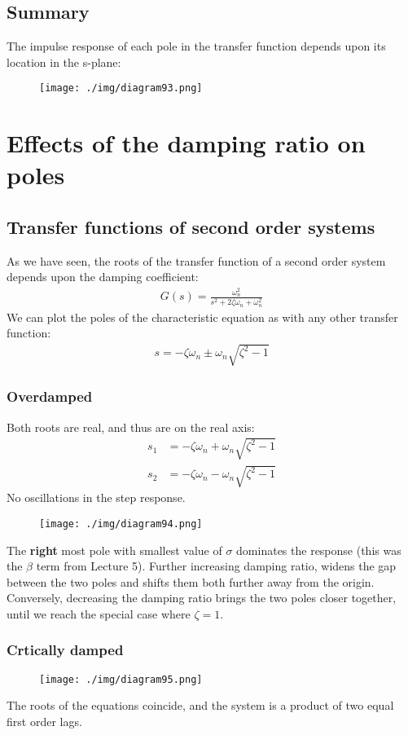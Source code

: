 \subsection{Summary}
The impulse response of each pole in the transfer function depends upon its location in the s-plane:
\begin{figure}[H]
  \centering
  \texttt{[image: ./img/diagram93.png]}
  \caption{}
\end{figure}
\section{Effects of the damping ratio on poles}
\subsection{Transfer functions of second order systems}
As we have seen, the roots of the transfer function of a second order system depends upon the damping coefficient:
\begin{align}
  G(s) = \frac{\omega_n^2}{s^2 + 2 \zeta \omega_n + \omega_n^2}
\end{align}
We can plot the poles of the characteristic equation as with any other transfer function:
\begin{align}
  s = -\zeta \omega_n \pm \omega_n \sqrt{\zeta^2 - 1}
\end{align}
\subsubsection{Overdamped}
Both roots are real, and thus are on the real axis:
\begin{align}
  s_1 & = -\zeta \omega_n + \omega_n \sqrt{\zeta^2 - 1} \\
  s_2 & = -\zeta \omega_n - \omega_n \sqrt{\zeta^2 - 1}
\end{align}
No oscillations in the step response.
\begin{figure}[H]
  \centerline{\texttt{[image: ./img/diagram94.png]}}
  \caption{}
\end{figure}
The \textbf{right} most pole with smallest value of $\sigma$ dominates the response (this was the $\beta$ term from Lecture 5). Further increasing damping ratio, widens the gap between the two poles and shifts them both further away from the origin. Conversely, decreasing the damping ratio brings the two poles closer together, until we reach the special case where $\zeta = 1$.
\subsubsection{Crtically damped}
\begin{figure}[H]
  \centerline{\texttt{[image: ./img/diagram95.png]}}
  \caption{}
\end{figure}
The roots of the equations coincide, and the system is a product of two equal first order lags.

